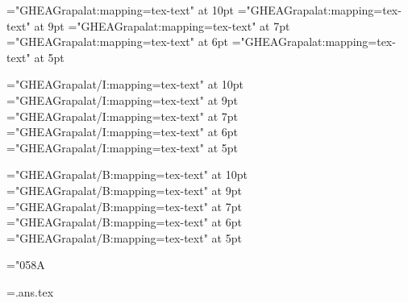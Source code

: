 

\pdfpagewidth=105mm
\pdfpageheight=148.5mm

\hsize=79mm
\vsize=115mm

\hoffset=-12.4mm
\voffset=-12.4mm

\font\armtenrm="GHEAGrapalat:mapping=tex-text" at 10pt
\font\armninerm="GHEAGrapalat:mapping=tex-text" at 9pt
\font\armsevenrm="GHEAGrapalat:mapping=tex-text" at 7pt
\font\armsixrm="GHEAGrapalat:mapping=tex-text" at 6pt
\font\armfiverm="GHEAGrapalat:mapping=tex-text" at 5pt

\font\armtenit="GHEAGrapalat/I:mapping=tex-text" at 10pt
\font\armnineit="GHEAGrapalat/I:mapping=tex-text" at 9pt
\font\armsevenit="GHEAGrapalat/I:mapping=tex-text" at 7pt
\font\armsixit="GHEAGrapalat/I:mapping=tex-text" at 6pt
\font\armfiveit="GHEAGrapalat/I:mapping=tex-text" at 5pt

\font\armtenbf="GHEAGrapalat/B:mapping=tex-text" at 10pt
\font\armninebf="GHEAGrapalat/B:mapping=tex-text" at 9pt
\font\armsevenbf="GHEAGrapalat/B:mapping=tex-text" at 7pt
\font\armsixbf="GHEAGrapalat/B:mapping=tex-text" at 6pt
\font\armfivebf="GHEAGrapalat/B:mapping=tex-text" at 5pt

\def\tenpoint{\def\hy{\fam0\armtenrm}%
  \def\it{\fam\itfam\armtenit} \textfont\itfam=\armtenit
  \def\bf{\fam\bffam\armtenbf} \textfont\bffam=\armtenbf
    \scriptfont\bffam=\armsevenbf \scriptscriptfont\bffam=\armfivebf
  \normalbaselineskip=14pt
  \setbox\strutbox=\hbox{\vrule height8.5pt depth5.5pt width 0pt}%
  \normalbaselines\hy}

\def\ninepoint{\def\hy{\fam0\armninerm}%
  \def\it{\fam\itfam\armnineit} \textfont\itfam=\armnineit
  \def\bf{\fam\bffam\armninebf} \textfont\bffam=\armninebf
    \scriptfont\bffam=\armsixbf \scriptscriptfont\bffam=\armfivebf
  \normalbaselineskip=12.6pt
  \setbox\strutbox=\hbox{\vrule height8pt depth4.6pt width 0pt}%
  \normalbaselines\hy}

\parindent=0pt
\baselineskip=14pt
\frenchspacing
{}
\hyphenchar\armtenrm="058A %

\newcount\problemcount {}
\def\problem{\vfill\eject%
  \advance\problemcount by1%
  {\bf \the\problemcount.}~}

\newwrite\ansf
\immediate\openout\ansf=\jobname.ans.tex
\def\answer#1{%
  \immediate\write\ansf{\the\problemcount. {\noexpand\it #1}}%
  \immediate\write\ansf{}}


